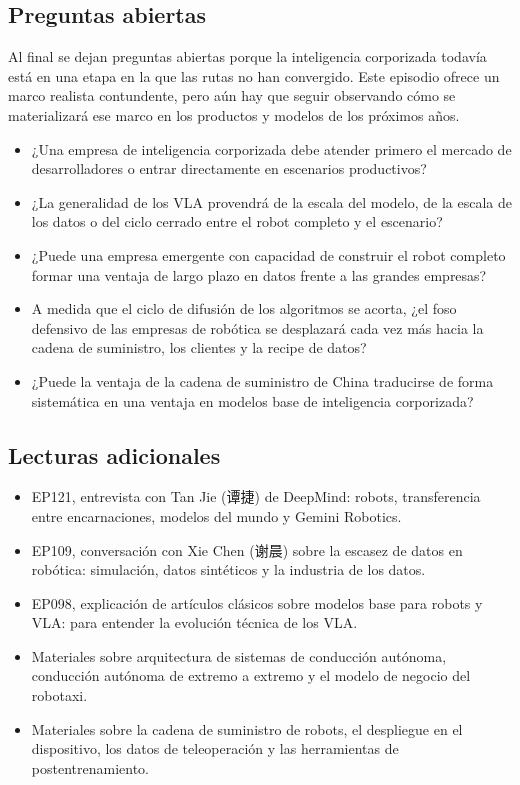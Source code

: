 \documentclass[a4paper]{article}
\begin{document}
\subsection{Preguntas abiertas}

Al final se dejan preguntas abiertas porque la inteligencia corporizada todavía está en una etapa en la que las rutas no han convergido. Este episodio ofrece un marco realista contundente, pero aún hay que seguir observando cómo se materializará ese marco en los productos y modelos de los próximos años.

\begin{itemize}
\item ¿Una empresa de inteligencia corporizada debe atender primero el mercado de desarrolladores o entrar directamente en escenarios productivos?
\item ¿La generalidad de los VLA provendrá de la escala del modelo, de la escala de los datos o del ciclo cerrado entre el robot completo y el escenario?
\item ¿Puede una empresa emergente con capacidad de construir el robot completo formar una ventaja de largo plazo en datos frente a las grandes empresas?
\item A medida que el ciclo de difusión de los algoritmos se acorta, ¿el foso defensivo de las empresas de robótica se desplazará cada vez más hacia la cadena de suministro, los clientes y la recipe de datos?
\item ¿Puede la ventaja de la cadena de suministro de China traducirse de forma sistemática en una ventaja en modelos base de inteligencia corporizada?
\end{itemize}

\subsection{Lecturas adicionales}

\begin{itemize}
\item EP121, entrevista con Tan Jie (谭捷) de DeepMind: robots, transferencia entre encarnaciones, modelos del mundo y Gemini Robotics.
\item EP109, conversación con Xie Chen (谢晨) sobre la escasez de datos en robótica: simulación, datos sintéticos y la industria de los datos.
\item EP098, explicación de artículos clásicos sobre modelos base para robots y VLA: para entender la evolución técnica de los VLA.
\item Materiales sobre arquitectura de sistemas de conducción autónoma, conducción autónoma de extremo a extremo y el modelo de negocio del robotaxi.
\item Materiales sobre la cadena de suministro de robots, el despliegue en el dispositivo, los datos de teleoperación y las herramientas de postentrenamiento.
\end{itemize}
\end{document}
